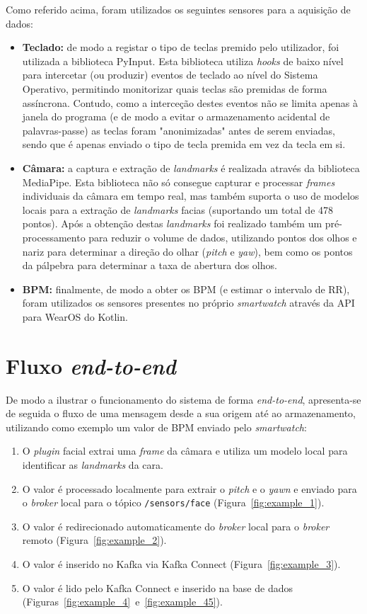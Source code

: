 Como referido acima, foram utilizados os seguintes sensores para a aquisição de dados:
\begin{itemize}
    \item \textbf{Teclado:} de modo a registar o tipo de teclas premido pelo utilizador, foi utilizada a biblioteca PyInput\cite{pyinput_docs}. Esta biblioteca utiliza \textit{hooks} de baixo nível para intercetar (ou produzir) eventos de teclado ao nível do Sistema Operativo, permitindo monitorizar quais teclas são premidas de forma assíncrona. Contudo, como a interceção destes eventos não se limita apenas à janela do programa (e de modo a evitar o armazenamento acidental de palavras-passe) as teclas foram "anonimizadas" antes de serem enviadas, sendo que é apenas enviado o tipo de tecla premida em vez da tecla em si.
    \item \textbf{Câmara:} a captura e extração de \textit{landmarks} é realizada através da biblioteca MediaPipe\cite{mediapipe_docs}. Esta biblioteca não só consegue capturar e processar \textit{frames} individuais da câmara em tempo real, mas também suporta o uso de modelos locais para a extração de \textit{landmarks} facias (suportando um total de 478 pontos). Após a obtenção destas \textit{landmarks} foi realizado também um pré-processamento para reduzir o volume de dados, utilizando pontos dos olhos e nariz para determinar a direção do olhar (\textit{pitch} e \textit{yaw}), bem como os pontos da pálpebra para determinar a taxa de abertura dos olhos.
    \item \textbf{\ac{BPM:}} finalmente, de modo a obter os \ac{BPM} (e estimar o intervalo de RR), foram utilizados os sensores presentes no próprio \textit{smartwatch} através da API para WearOS do Kotlin.
\end{itemize}

\section{Fluxo \textit{end-to-end}}

De modo a ilustrar o funcionamento do sistema de forma \textit{end-to-end}, apresenta-se de seguida o fluxo de uma mensagem desde a sua origem até ao armazenamento, utilizando como exemplo um valor de \ac{BPM} enviado pelo \textit{smartwatch}:
\begin{enumerate}
    \item O \textit{plugin} facial extrai uma \textit{frame} da câmara e utiliza um modelo local para identificar as \textit{landmarks} da cara.
    \item O valor é processado localmente para extrair o \textit{pitch} e o \textit{yawn} e enviado para o \textit{broker} local para o tópico \texttt{/sensors/face} (Figura~\ref{fig:example_1}).
    \item O valor é redirecionado automaticamente do \textit{broker} local para o \textit{broker} remoto (Figura~\ref{fig:example_2}).
    \item O valor é inserido no Kafka via Kafka Connect (Figura~\ref{fig:example_3}).
    \item O valor é lido pelo Kafka Connect e inserido na base de dados (Figuras~\ref{fig:example_4}~e~\ref{fig:example_45}).
\end{enumerate}

